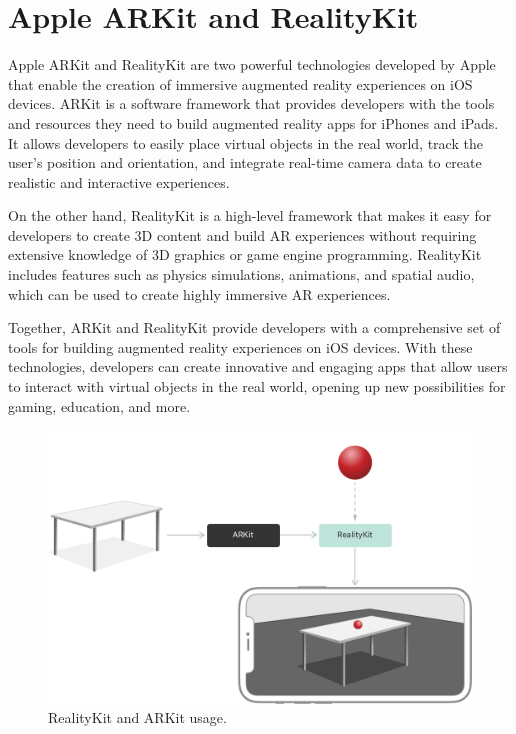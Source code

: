 \documentclass{report}
\begin{document}
\section{Apple ARKit and RealityKit}

Apple ARKit and RealityKit are two powerful technologies developed by Apple that enable the creation of immersive augmented reality experiences on iOS devices. ARKit is a software framework that provides developers with the tools and resources they need to build augmented reality apps for iPhones and iPads. It allows developers to easily place virtual objects in the real world, track the user's position and orientation, and integrate real-time camera data to create realistic and interactive experiences.

On the other hand, RealityKit is a high-level framework that makes it easy for developers to create 3D content and build AR experiences without requiring extensive knowledge of 3D graphics or game engine programming. RealityKit includes features such as physics simulations, animations, and spatial audio, which can be used to create highly immersive AR experiences.

Together, ARKit and RealityKit provide developers with a comprehensive set of tools for building augmented reality experiences on iOS devices. With these technologies, developers can create innovative and engaging apps that allow users to interact with virtual objects in the real world, opening up new possibilities for gaming, education, and more.

\begin{figure}[!ht]
  \centering
  \includegraphics[width=\textwidth]{realitykit.png}
  \caption{RealityKit and ARKit usage.}
  \label{fig:TexnicCenter}
\end{figure}
\end{document}
